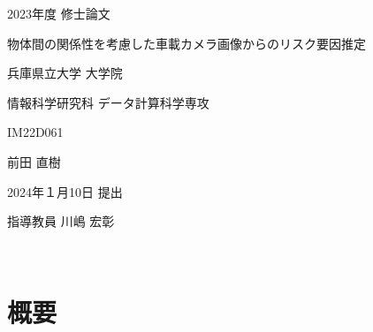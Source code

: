 \documentclass[a4paper,twoside,dvipdfmx,11pt]{jarticle}
\begin{document}
\begin{titlepage}

    \begin{center}

    {\huge 2023年度 修士論文}

    \vspace*{150truept}

    {\Huge 物体間の関係性を考慮した車載カメラ画像からのリスク要因推定} 

    \vspace{130truept}

    {\Large 兵庫県立大学 大学院}

    \vspace{10truept}

    {\Large 情報科学研究科 データ計算科学専攻}

    \vspace{70truept}

    {\Large IM22D061}

    \vspace{10truept}

    {\Large 前田 直樹}

    \vspace{30truept}

    {\Large 2024年１月10日 提出}      

    \vspace{10truept}

    {\Large 指導教員 川嶋 宏彰}

    \end{center}
\end{titlepage}


\newpage
\thispagestyle{empty}
　　
\newpage

\section*{概要}
\thispagestyle{empty}
\fi


\msubtitle{\ }%
\end{document}
